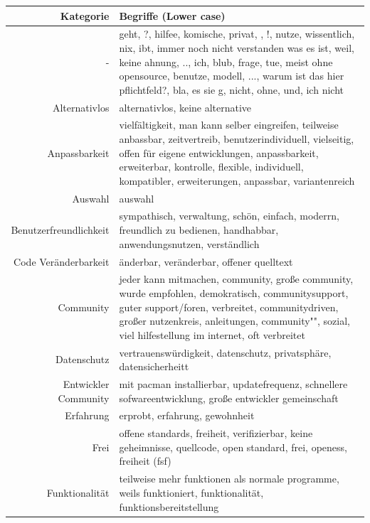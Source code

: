 \documentclass[a4paper]{article}
\begin{document}
            
            \begin{table}[!htbp]
                \begin{tabularx}{\textwidth}{rX}
                    Kategorie & Begriffe (Lower case) \\
                    \hline
                    - & \tiny geht, ?, hilfee, komische, privat, , !, nutze, wissentlich, nix, ibt, immer noch nicht verstanden was es ist, weil, keine ahnung, .., ich, blub, frage, tue, meist ohne opensource, benutze, modell, ..., warum ist das hier pflichtfeld?, bla, es sie g, nicht, ohne, und, ich nicht\\
                    Alternativlos & \tiny alternativlos, keine alternative\\
                    Anpassbarkeit & \tiny vielfältigkeit, man kann selber eingreifen, teilweise anbassbar, zeitvertreib, benutzerindividuell, vielseitig, offen für eigene entwicklungen, anpassbarkeit, erweiterbar, kontrolle, flexible, individuell, kompatibler, erweiterungen, anpassbar, variantenreich\\
                    Auswahl & \tiny auswahl\\
                    Benutzerfreundlichkeit & \tiny sympathisch, verwaltung, schön, einfach, moderrn, freundlich zu bedienen, handhabbar, anwendungsnutzen, verständlich\\
                    Code Veränderbarkeit & \tiny änderbar, veränderbar, offener quelltext\\
                    Community & \tiny jeder kann mitmachen, community, große community, wurde empfohlen, demokratisch, communitysupport, guter support/foren, verbreitet, communitydriven, großer nutzenkreis, anleitungen, community"", sozial, viel hilfestellung im internet, oft verbreitet\\
                    Datenschutz & \tiny vertrauenswürdigkeit, datenschutz, privatsphäre, datensicherheitt\\
                    Entwickler Community & \tiny mit pacman installierbar, updatefrequenz, schnellere sofwareentwicklung, große entwickler gemeinschaft\\
                    Erfahrung & \tiny erprobt, erfahrung, gewohnheit\\
                    Frei & \tiny offene standards, freiheit, verifizierbar, keine geheimnisse, quellcode, open standard, frei, openess, freiheit (fsf)\\
                    Funktionalität & \tiny teilweise mehr funktionen als normale programme, weils funktioniert, funktionalität, funktionsbereitstellung\\

\end{tabularx}
\end{table}
\end{document}
